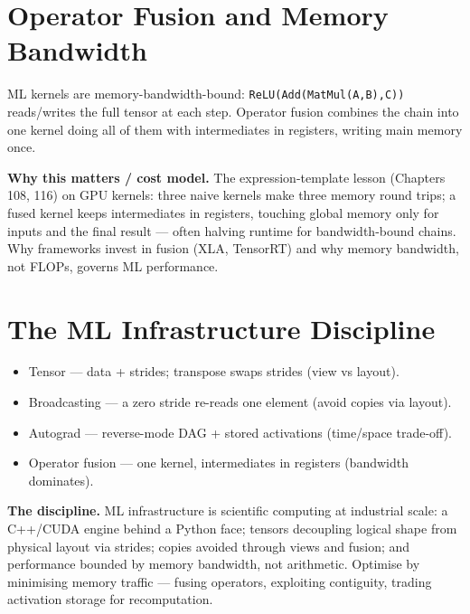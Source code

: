 \section{Operator Fusion and Memory Bandwidth}
ML kernels are memory-bandwidth-bound: \texttt{ReLU(Add(MatMul(A,B),C))} reads/writes the full tensor at each step. Operator fusion combines the chain into one kernel doing all of them with intermediates in registers, writing main memory once.

\textbf{Why this matters / cost model.} The expression-template lesson (Chapters 108, 116) on GPU kernels: three naive kernels make three memory round trips; a fused kernel keeps intermediates in registers, touching global memory only for inputs and the final result --- often halving runtime for bandwidth-bound chains. Why frameworks invest in fusion (XLA, TensorRT) and why memory bandwidth, not FLOPs, governs ML performance.

\section{The ML Infrastructure Discipline}
\begin{itemize}
\item Tensor --- data + strides; transpose swaps strides (view vs layout).
\item Broadcasting --- a zero stride re-reads one element (avoid copies via layout).
\item Autograd --- reverse-mode DAG + stored activations (time/space trade-off).
\item Operator fusion --- one kernel, intermediates in registers (bandwidth dominates).
\end{itemize}

\textbf{The discipline.} ML infrastructure is scientific computing at industrial scale: a C++/CUDA engine behind a Python face; tensors decoupling logical shape from physical layout via strides; copies avoided through views and fusion; and performance bounded by memory bandwidth, not arithmetic. Optimise by minimising memory traffic --- fusing operators, exploiting contiguity, trading activation storage for recomputation.

